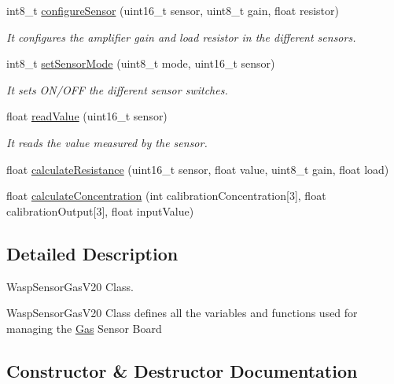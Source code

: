 \begin{DoxyCompactItemize}
int8\+\_\+t \hyperlink{class_wasp_sensor_gas__v20_a515a76ac7bb13c2bc6a317070e10800d}{configure\+Sensor} (uint16\+\_\+t sensor, uint8\+\_\+t gain, float resistor)
\begin{DoxyCompactList}\small\item\em It configures the amplifier gain and load resistor in the different sensors. \end{DoxyCompactList}\item 
int8\+\_\+t \hyperlink{class_wasp_sensor_gas__v20_a8cff44e0e0b867642b302f0e3ded8117}{set\+Sensor\+Mode} (uint8\+\_\+t mode, uint16\+\_\+t sensor)
\begin{DoxyCompactList}\small\item\em It sets O\+N/\+O\+FF the different sensor switches. \end{DoxyCompactList}\item 
float \hyperlink{class_wasp_sensor_gas__v20_a6adecc3646770842238aa97792bffc66}{read\+Value} (uint16\+\_\+t sensor)
\begin{DoxyCompactList}\small\item\em It reads the value measured by the sensor. \end{DoxyCompactList}\item 
float \hyperlink{class_wasp_sensor_gas__v20_a29686cfc0b93b3a7a4f6ba73b45d1ef1}{calculate\+Resistance} (uint16\+\_\+t sensor, float value, uint8\+\_\+t gain, float load)
\item 
float \hyperlink{class_wasp_sensor_gas__v20_a8383272b5391ba31658dd629e3c46607}{calculate\+Concentration} (int calibration\+Concentration\mbox{[}3\mbox{]}, float calibration\+Output\mbox{[}3\mbox{]}, float input\+Value)
\end{DoxyCompactItemize}


\subsection{Detailed Description}
Wasp\+Sensor\+Gas\+V20 Class. 

Wasp\+Sensor\+Gas\+V20 Class defines all the variables and functions used for managing the \hyperlink{class_gas}{Gas} Sensor Board 

\subsection{Constructor \& Destructor Documentation}
